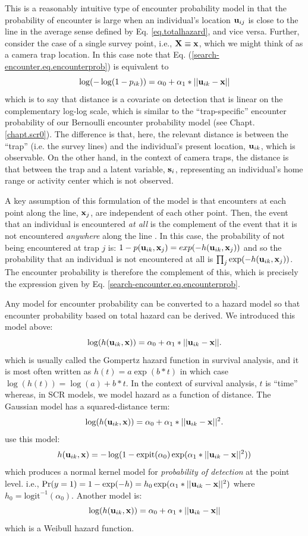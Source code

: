 This is a reasonably intuitive type of encounter probability model in
that the probability of encounter is large when an individual's
location ${\bf u}_{ij}$ is close to the line in the average sense
defined by Eq. \ref{eq.totalhazard}, and vice versa.
Further, consider the case of a single survey point, i.e., ${\bf X} \equiv {\bf
  x}$, which we might think of as a camera trap location.  In this
case note that Eq. (\ref{search-encounter.eq.encounterprob}) is equivalent to
\[
\log(-\log(1-p_{ik})) = \alpha_{0} + \alpha_{1}*||{\bf u}_{ik}-{\bf x}||
\]
which is to say that distance is a covariate on detection that is
linear on the complementary log-log scale, which is similar to the
``trap-specific'' encounter probability of our Bernoulli encounter
probability model (see Chapt. \ref{chapt.scr0}).
The difference is that, here, the relevant distance
is between the ``trap'' (i.e. the survey lines) and the individual's
present location, ${\bf u}_{ik}$, which is observable. On the other
hand, in the context of camera traps, the distance is that between the
trap and a latent variable, ${\bf s}_{i}$, representing an
individual's home range or activity center which is not observed.


A key assumption of this formulation of the model is that
encounters at each point along the line, ${\bf x}_{j}$, are
independent of each other point. Then, the event that an individual is
encountered {\it at all} is the complement of the event that it is not
encountered {\it anywhere} along the line \citep{hayes_buckland:1983}.
In this case, the probability of not being encountered at trap $j$ is:
 $1-p({\bf u}_{ik},{\bf x}_{j}) = exp(-h({\bf u}_{ik},{\bf x}_{j}))$
and so the probability that an individual is not encountered at all is
 $\prod_{j} \exp(-h({\bf u}_{ik},{\bf x}_{j}))$. The encounter
probability is therefore the complement of this, which is precisely
the expression given by Eq. \ref{search-encounter.eq.encounterprob}.


Any model for encounter probability can be converted to a hazard model
so that encounter probability based on total hazard can be derived.
We introduced this model above:
\[
\log(h({\bf u}_{ik},{\bf x})) = \alpha_{0} + \alpha_{1}*||{\bf u}_{ik}-{\bf x}||.
\]
which is usually called the Gompertz hazard function in survival
analysis, and it is most often written as $h(t) = a \exp( b*t)$ in which
case $\log(h(t)) = \log(a) + b*t$. In the context of survival
analysis, $t$ is ``time'' whereas, in SCR models, we model hazard as a
function of distance. 
The Gaussian model has a  squared-distance term:
\[
\log(h({\bf u}_{ik},{\bf x})) = \alpha_{0} + \alpha_{1}* ||{\bf u}_{ik}-{\bf x}||^2.
\]
 \citet{borchers_efford:2008} use this model:
\[
h({\bf u}_{ik},{\bf x} ) = -\log(1 - \mbox{expit}(\alpha_{0})
\exp( \alpha_{1}*||{\bf u}_{ik} - {\bf x}||^2 ) )
\]
which produces a normal kernel model for {\it probability of
  detection} at the point level. i.e., $\Pr(y=1) = 1-\exp(-h) = h_{0}
\exp( \alpha_{1}*||{\bf u}_{ik} - {\bf x}||^2 )$ where $h_{0} =
\mbox{logit}^{-1}(\alpha_{0})$.
Another model is:
\[
\log(h({\bf u}_{ik},{\bf x})) = \alpha_{0} + \alpha_{1}*||{\bf u}_{ik}-{\bf x}||
\]
which is a Weibull hazard function.



